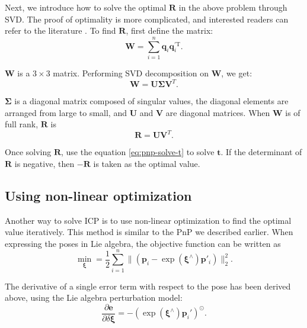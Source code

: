 Next, we introduce how to solve the optimal $\mathbf{R}$ in the above problem through SVD. The proof of optimality is more complicated, and interested readers can refer to the literature \cite{Arun1987, PomerleauColasSiegwart2015}. To find $\mathbf{R}$, first define the matrix:
\begin{equation}
\mathbf{W} =  \sum\limits_{i = 1}^n \mathbf{q}_i \mathbf{q}^{\prime \mathrm{T}}_i.
\end{equation}

$\mathbf{W}$ is a $3 \times 3$ matrix. Performing SVD decomposition on $\mathbf{W}$, we get:
\begin{equation}
\mathbf{W} = \mathbf{U \Sigma V}^T.
\end{equation}

$\boldsymbol{\Sigma}$ is a diagonal matrix composed of singular values, the diagonal elements are arranged from large to small, and $\mathbf{U}$ and $\mathbf{V}$ are diagonal matrices. When $\mathbf{W}$ is of full rank, $\mathbf{R}$ is
\begin{equation}
\mathbf{R} = \mathbf{U} \mathbf{V}^T.
\end{equation}

Once solving $\mathbf{R}$, use the equation \eqref{eq:pnp-solve-t} to solve $\mathbf{t}$. If the determinant of $\mathbf{R}$ is negative, then $-\mathbf{R}$ is taken as the optimal value.

\subsection{Using non-linear optimization}
Another way to solve ICP is to use non-linear optimization to find the optimal value iteratively. This method is similar to the PnP we described earlier. When expressing the poses in Lie algebra, the objective function can be written as
\begin{equation}
\mathop {\min }\limits_{\boldsymbol{\xi}} = \frac{1}{2} \sum\limits_{i = 1}^n\| {\left( {{{\mathbf{p}}_i} - \exp \left( \boldsymbol{\xi}^\wedge \right) {\mathbf{p}}'_i} \right)} \|^2_2.
\end{equation}

The derivative of a single error term with respect to the pose has been derived above, using the Lie algebra perturbation model:
\begin{equation}
\frac{{\partial \mathbf{e}}}{{\partial \delta \boldsymbol{\xi} }} =  - {\left( {\exp \left( {{ \boldsymbol{\xi} ^ \wedge }} \right){{\mathbf{p}}_i}'} \right)^ \odot }.
\end{equation}

